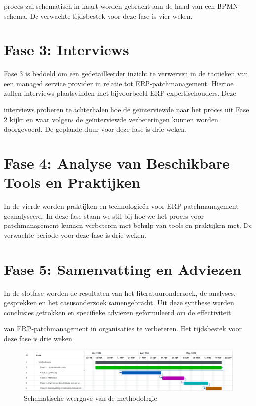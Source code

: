 proces zal schematisch in kaart worden gebracht aan de hand van een BPMN-schema. De verwachte tijdsbestek voor deze fase is vier weken.
\section{Fase 3: Interviews}
Fase 3 is bedoeld om een gedetailleerder inzicht te verwerven in de tactieken van een managed service provider in relatie tot ERP-patchmanagement. Hiertoe zullen interviews plaatsvinden met bijvoorbeeld ERP-expertisehouders. Deze 

interviews proberen te achterhalen hoe de geïnterviewde naar het proces uit Fase 2 kijkt en waar volgens de geïnterviewde verbeteringen kunnen worden doorgevoerd. De geplande duur voor deze fase is drie weken.
\section{Fase 4: Analyse van Beschikbare Tools en Praktijken}
In de vierde worden praktijken en technologieën voor ERP-patchmanagement geanalyseerd. In deze fase staan we stil bij hoe we het proces voor patchmanagement kunnen verbeteren met behulp van tools en praktijken met. De verwachte periode voor deze fase is drie weken.
\section{Fase 5: Samenvatting en Adviezen}
In de slotfase worden de resultaten van het literatuuronderzoek, de analyses, gesprekken en het casusonderzoek samengebracht. Uit deze synthese worden conclusies getrokken en specifieke adviezen geformuleerd om de effectiviteit 

van ERP-patchmanagement in organisaties te verbeteren. Het tijdsbestek voor deze fase is drie weken. \\

\begin{figure}[h]
    \centering
    \includegraphics[width=\textwidth]{methodologie2.png}
    \caption{Schematische weergave van de methodologie}
     \label{fig:methodologie2}
\end{figure}
\newpage
